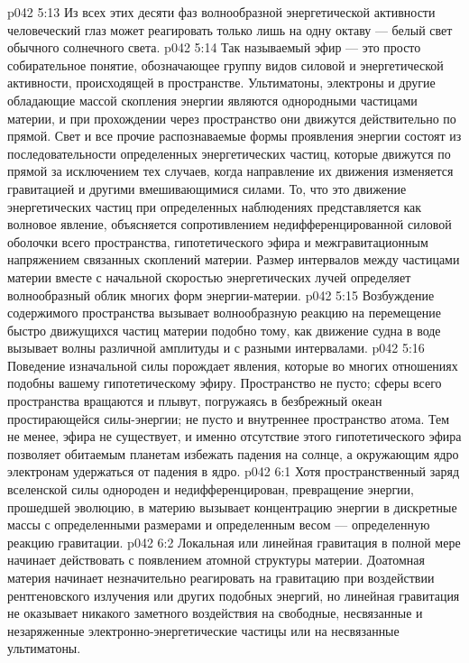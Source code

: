 \vs p042 5:13 \pc Из всех этих десяти фаз волнообразной энергетической активности человеческий глаз может реагировать только лишь на одну октаву --- белый свет обычного солнечного света.
\vs p042 5:14 \pc Так называемый эфир --- это просто собирательное понятие, обозначающее группу видов силовой и энергетической активности, происходящей в пространстве. Ультиматоны, электроны и другие обладающие массой скопления энергии являются однородными частицами материи, и при прохождении через пространство они движутся действительно по прямой. Свет и все прочие распознаваемые формы проявления энергии состоят из последовательности определенных энергетических частиц, которые движутся по прямой за исключением тех случаев, когда направление их движения изменяется гравитацией и другими вмешивающимися силами. То, что это движение энергетических частиц при определенных наблюдениях представляется как волновое явление, объясняется сопротивлением недифференцированной силовой оболочки всего пространства, гипотетического эфира и межгравитационным напряжением связанных скоплений материи. Размер интервалов между частицами материи вместе с начальной скоростью энергетических лучей определяет волнообразный облик многих форм энергии\hyp{}материи.
\vs p042 5:15 Возбуждение содержимого пространства вызывает волнообразную реакцию на перемещение быстро движущихся частиц материи подобно тому, как движение судна в воде вызывает волны различной амплитуды и с разными интервалами.
\vs p042 5:16 Поведение изначальной силы порождает явления, которые во многих отношениях подобны вашему гипотетическому эфиру. Пространство не пусто; сферы всего пространства вращаются и плывут, погружаясь в безбрежный океан простирающейся силы\hyp{}энергии; не пусто и внутреннее пространство атома. Тем не менее, эфира не существует, и именно отсутствие этого гипотетического эфира позволяет обитаемым планетам избежать падения на солнце, а окружающим ядро электронам удержаться от падения в ядро.
\vs p042 6:1 Хотя пространственный заряд вселенской силы однороден и недифференцирован, превращение энергии, прошедшей эволюцию, в материю вызывает концентрацию энергии в дискретные массы с определенными размерами и определенным весом --- определенную реакцию гравитации.
\vs p042 6:2 Локальная или линейная гравитация в полной мере начинает действовать с появлением атомной структуры материи. Доатомная материя начинает незначительно реагировать на гравитацию при воздействии рентгеновского излучения или других подобных энергий, но линейная гравитация не оказывает никакого заметного воздействия на свободные, несвязанные и незаряженные электронно\hyp{}энергетические частицы или на несвязанные ультиматоны.
